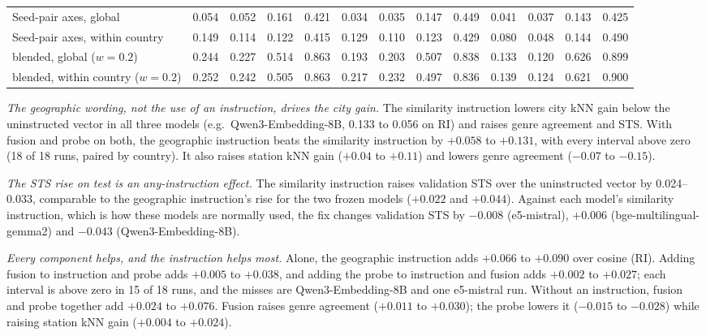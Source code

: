 \begin{table}[t]
\begin{tabular}{@{}lcccccccccccc@{}}
\midrule
Seed-pair axes, global & 0.054 & 0.052 & 0.161 & 0.421 & 0.034 & 0.035 & 0.147 & 0.449 & 0.041 & 0.037 & 0.143 & 0.425 \\
Seed-pair axes, within country & 0.149 & 0.114 & 0.122 & 0.415 & 0.129 & 0.110 & 0.123 & 0.429 & 0.080 & 0.048 & 0.144 & 0.490 \\
\quad blended, global ($w=0.2$) & 0.244 & 0.227 & 0.514 & 0.863 & 0.193 & 0.203 & 0.507 & 0.838 & 0.133 & 0.120 & 0.626 & 0.899 \\
\quad blended, within country ($w=0.2$) & 0.252 & 0.242 & 0.505 & 0.863 & 0.217 & 0.232 & 0.497 & 0.836 & 0.139 & 0.124 & 0.621 & 0.900 \\
\bottomrule
\end{tabular}
\end{table}

\emph{The geographic wording, not the use of an instruction, drives the city gain.} The similarity instruction lowers city kNN gain below the uninstructed vector in all three models (e.g.\ Qwen3-Embedding-8B, 0.133 to 0.056 on RI) and raises genre agreement and STS. With fusion and probe on both, the geographic instruction beats the similarity instruction by $+0.058$ to $+0.131$, with every interval above zero (18 of 18 runs, paired by country). It also raises station kNN gain ($+0.04$ to $+0.11$) and lowers genre agreement ($-0.07$ to $-0.15$).

\emph{The STS rise on test is an any-instruction effect.} The similarity instruction raises validation STS over the uninstructed vector by 0.024--0.033, comparable to the geographic instruction's rise for the two frozen models ($+0.022$ and $+0.044$). Against each model's similarity instruction, which is how these models are normally used, the fix changes validation STS by $-0.008$ (e5-mistral), $+0.006$ (bge-multilingual-gemma2) and $-0.043$ (Qwen3-Embedding-8B).

\emph{Every component helps, and the instruction helps most.} Alone, the geographic instruction adds $+0.066$ to $+0.090$ over cosine (RI). Adding fusion to instruction and probe adds $+0.005$ to $+0.038$, and adding the probe to instruction and fusion adds $+0.002$ to $+0.027$; each interval is above zero in 15 of 18 runs, and the misses are Qwen3-Embedding-8B and one e5-mistral run. Without an instruction, fusion and probe together add $+0.024$ to $+0.076$. Fusion raises genre agreement ($+0.011$ to $+0.030$); the probe lowers it ($-0.015$ to $-0.028$) while raising station kNN gain ($+0.004$ to $+0.024$).

